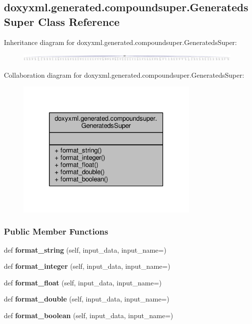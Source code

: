 \subsection{doxyxml.\+generated.\+compoundsuper.\+Generateds\+Super Class Reference}
\label{classdoxyxml_1_1generated_1_1compoundsuper_1_1GeneratedsSuper}


Inheritance diagram for doxyxml.\+generated.\+compoundsuper.\+Generateds\+Super\+:
\nopagebreak
\begin{figure}[H]
\begin{center}
\leavevmode
\includegraphics[width=350pt]{d6/d42/classdoxyxml_1_1generated_1_1compoundsuper_1_1GeneratedsSuper__inherit__graph}
\end{center}
\end{figure}


Collaboration diagram for doxyxml.\+generated.\+compoundsuper.\+Generateds\+Super\+:
\nopagebreak
\begin{figure}[H]
\begin{center}
\leavevmode
\includegraphics[width=254pt]{d8/d68/classdoxyxml_1_1generated_1_1compoundsuper_1_1GeneratedsSuper__coll__graph}
\end{center}
\end{figure}
\subsubsection*{Public Member Functions}
\begin{DoxyCompactItemize}
\item 
def {\bf format\+\_\+string} (self, input\+\_\+data, input\+\_\+name=\textquotesingle{}\textquotesingle{})
\item 
def {\bf format\+\_\+integer} (self, input\+\_\+data, input\+\_\+name=\textquotesingle{}\textquotesingle{})
\item 
def {\bf format\+\_\+float} (self, input\+\_\+data, input\+\_\+name=\textquotesingle{}\textquotesingle{})
\item 
def {\bf format\+\_\+double} (self, input\+\_\+data, input\+\_\+name=\textquotesingle{}\textquotesingle{})
\item 
def {\bf format\+\_\+boolean} (self, input\+\_\+data, input\+\_\+name=\textquotesingle{}\textquotesingle{})
\end{DoxyCompactItemize}


